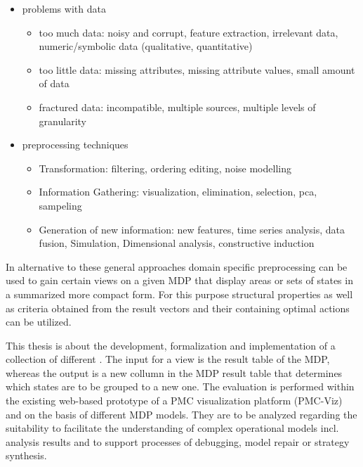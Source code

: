 \documentclass[preview]{standalone}
\begin{document}
\begin{itemize}
	\item problems with data
	\begin{itemize}
		\item too much data: noisy and corrupt, feature extraction, irrelevant data, numeric/symbolic data (qualitative, quantitative)
		\item too little data: missing attributes, missing attribute values, small amount of data
		\item fractured data: incompatible, multiple sources, multiple levels of granularity
	\end{itemize}
	\item preprocessing techniques 
	\begin{itemize}
		\item Transformation: filtering, ordering editing, noise modelling
		\item Information Gathering: visualization, elimination, selection, pca, sampeling
		\item Generation of new information: new features, time series analysis, data fusion, Simulation, Dimensional analysis, constructive induction
	\end{itemize}
\end{itemize}

In alternative to these general approaches domain specific preprocessing can be used to gain certain views on a given MDP that display areas or sets of states in a summarized more compact form. For this purpose structural properties as well as criteria obtained from the result vectors and their containing optimal actions can be utilized.


This thesis is about the development, formalization and implementation of a collection of different \emph{\viewsN}.
The input for a view is the result table of the MDP, whereas the output is a new collumn in the MDP result table that determines which states are to be grouped to a new one.
The evaluation is performed within the existing web-based prototype of a PMC visualization platform (PMC-Viz) and on the basis of different MDP models. They are to be analyzed regarding the suitability to facilitate the understanding of complex operational models incl. analysis results and to support processes of debugging, model repair or strategy synthesis.
\end{document}
